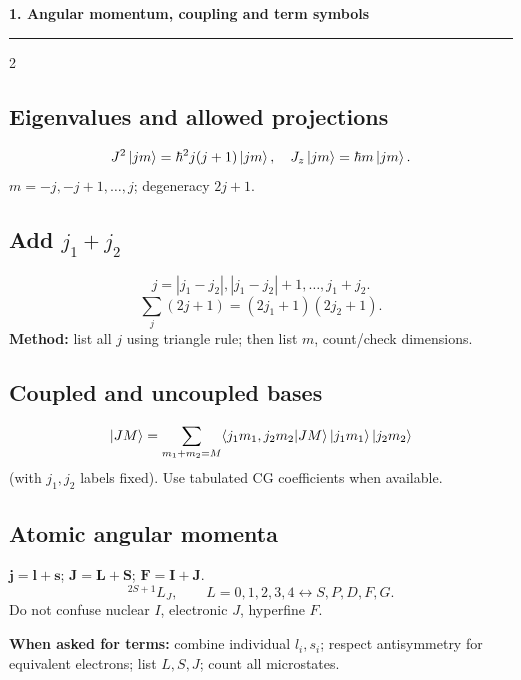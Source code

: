 
{\Large\bfseries\color{accent}1. Angular momentum, coupling and term symbols}
\hrule\smallskip
\begin{multicols}{2}
\subsection*{Eigenvalues and allowed projections}
\[
J^2\left\lvert jm\right\rangle=\hbar^2j(j+1)\left\lvert jm\right\rangle,\quad
J_z\left\lvert jm\right\rangle=\hbar m\left\lvert jm\right\rangle.
\]
\(m=-j,-j+1,\ldots,j\); degeneracy \(2j+1\).
\subsection*{Add \(j_1+j_2\)}
\[
j=|j_1-j_2|,|j_1-j_2|+1,\ldots,j_1+j_2.
\]
\[
\sum_j(2j+1)=(2j_1+1)(2j_2+1).
\]
\textbf{Method:} list all \(j\) using triangle rule;
then list \(m\), count/check dimensions.
\subsection*{Coupled and uncoupled bases}
\[
\left\lvert JM\right\rangle=\sum_{m_1+m_2=M}
\langle j_1m_1,j_2m_2|JM\rangle
\left\lvert j_1m_1\right\rangle\left\lvert j_2m_2\right\rangle
\]
(with \(j_1,j_2\) labels fixed).
Use tabulated CG coefficients when available.
\subsection*{Atomic angular momenta}
\(\mathbf j=\mathbf l+\mathbf s\);
\(\mathbf J=\mathbf L+\mathbf S\);
\(\mathbf F=\mathbf I+\mathbf J\).
\[
{}^{2S+1}L_J,\qquad L=0,1,2,3,4\longleftrightarrow S,P,D,F,G.
\]
Do not confuse nuclear \(I\), electronic \(J\), hyperfine \(F\).
\begin{methodbox}
\textbf{When asked for terms:} combine individual
\(l_i,s_i\); respect antisymmetry for equivalent electrons;
list \(L,S,J\); count all microstates.
\end{methodbox}
\end{multicols}
